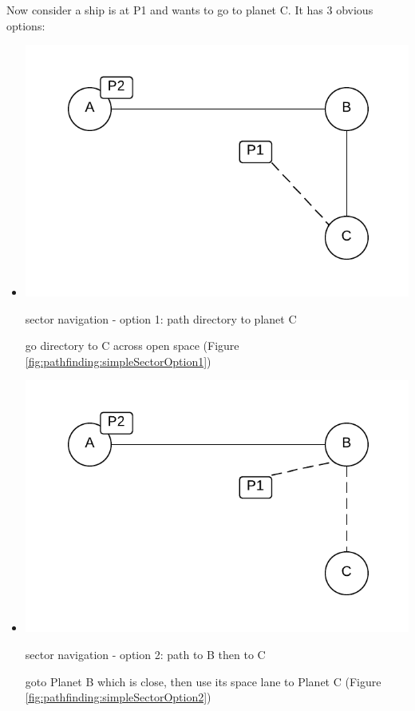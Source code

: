 Now consider a ship is at P1 and wants to go to planet C.
It has 3 obvious options:
\begin{itemize}
\item 
\begin{marginfigure}
	\includegraphics{res/pathfinding/PathFindingSectorOption1.pdf}
    \caption{sector navigation - option 1: path directory to planet C}
	\label{fig:pathfinding:simpleSectorOption1}
\end{marginfigure}
go directory to C across open space (Figure \ref{fig:pathfinding:simpleSectorOption1})

\item 
\begin{marginfigure}
	\includegraphics{res/pathfinding/PathFindingSectorOption2.pdf}
    \caption{sector navigation - option 2: path to B then to C}
	\label{fig:pathfinding:simpleSectorOption2}
\end{marginfigure}
goto Planet B which is close, then use its space lane to Planet C (Figure \ref{fig:pathfinding:simpleSectorOption2})


\end{itemize}

